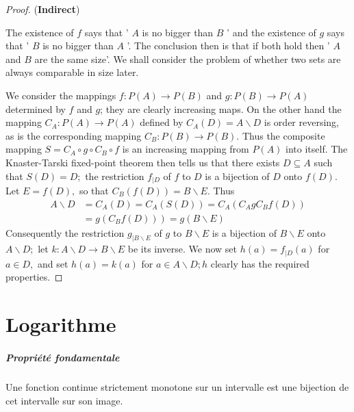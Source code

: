 \documentclass[12pt]{book}
\theoremstyle{definition}\newtheorem{dfn}{Définition}[chapter]
\theoremstyle{plain}\newtheorem{thm}{Théorème}[chapter]
\theoremstyle{plain}\newtheorem{prp}{Proposition}[chapter]
\theoremstyle{plain}\newtheorem{lem}{\bf Lemme}[chapter]
\theoremstyle{plain}\newtheorem{axm}{\bf Axiome}[chapter]
\theoremstyle{plain}\newtheorem{lmm}{\bf Lemme}[chapter]
\theoremstyle{plain}\newtheorem{cor}{\bf Corollaire}[chapter]
\theoremstyle{remark}\newtheorem{rem}{Remarque}[chapter]
\begin{document}
\begin{proof}
({\bf Indirect})

The existence of $f$ says that ' $A$ is no bigger than $B$ ' and the existence of $g$ says that ' $B$ is no bigger than $A$ '. The conclusion then is that if both hold then ' $A$ and $B$ are the same size'. We shall consider the problem of whether two sets are always comparable in size later.

We consider the mappings $f: P(A) \rightarrow P(B)$ and $g: P(B) \rightarrow P(A)$ determined by $f$ and $g$; they are clearly increasing maps. On the other hand the mapping $C_{A}: P(A) \rightarrow P(A)$ defined by $C_{A}(D)=A \backslash D$ is order reversing, as is the corresponding mapping $C_{B}: P(B) \rightarrow P(B)$. Thus the composite mapping $S=C_{A} \circ g \circ C_{B} \circ f$ is an increasing mapping from $P(A)$ into itself. The Knaster-Tarski fixed-point theorem then tells us that there exists $D \subseteq A$ such that $S(D)=D ;$ the restriction $f_{\mid D}$ of $f$ to $D$ is a bijection of $D$ onto $f(D) .$ Let $E=f(D),$ so that $C_{B}(f(D))=B \backslash E .$ Thus
$$
\begin{aligned}
A \backslash D &=C_{A}(D)=C_{A}(S(D))=C_{A}\left(C_{A} g C_{B} f(D)\right) \\
&\left.=g\left(C_{B} f(D)\right)\right)=g(B \backslash E)
\end{aligned}
$$
Consequently the restriction $g_{\mid B \backslash E}$ of $g$ to $B \backslash E$ is a bijection of $B \backslash E$ onto $A \backslash D ;$ let $k: A \backslash D \rightarrow B \backslash E$ be its inverse. We now set $h(a)=f_{\mid D}(a)$
for $a \in D,$ and set $h(a)=k(a)$ for $a \in A \backslash D ; h$ clearly has the required properties.

\end{proof}










        \chapter{Logarithme}
        \paragraph{Propriété fondamentale} Une fonction continue strictement monotone sur un intervalle est une bijection de cet intervalle sur son image.
\end{document}
